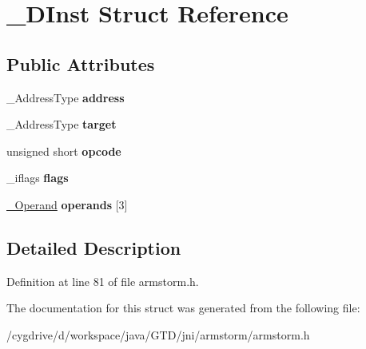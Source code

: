 \hypertarget{struct__DInst}{\section{\-\_\-\-D\-Inst Struct Reference}
\label{struct__DInst}
}
\subsection*{Public Attributes}
\begin{DoxyCompactItemize}
\item 
\hypertarget{struct__DInst_a89f4a30039aa3a611262180a28762454}{\-\_\-\-Address\-Type {\bfseries address}}\label{struct__DInst_a89f4a30039aa3a611262180a28762454}

\item 
\hypertarget{struct__DInst_a0dbdebdf13114d9f51bc7654fcec6de9}{\-\_\-\-Address\-Type {\bfseries target}}\label{struct__DInst_a0dbdebdf13114d9f51bc7654fcec6de9}

\item 
\hypertarget{struct__DInst_af21d9781d22dc937884c2f8f718e975e}{unsigned short {\bfseries opcode}}\label{struct__DInst_af21d9781d22dc937884c2f8f718e975e}

\item 
\hypertarget{struct__DInst_a90ddc87bf666f71480bd5f436744c82e}{\-\_\-iflags {\bfseries flags}}\label{struct__DInst_a90ddc87bf666f71480bd5f436744c82e}

\item 
\hypertarget{struct__DInst_a510b480946210daab40a67cd23835339}{\hyperlink{struct__Operand}{\-\_\-\-Operand} {\bfseries operands} \mbox{[}3\mbox{]}}\label{struct__DInst_a510b480946210daab40a67cd23835339}

\end{DoxyCompactItemize}


\subsection{Detailed Description}


Definition at line 81 of file armstorm.\-h.



The documentation for this struct was generated from the following file\-:\begin{DoxyCompactItemize}
\item 
/cygdrive/d/workspace/java/\-G\-T\-D/jni/armstorm/armstorm.\-h\end{DoxyCompactItemize}
